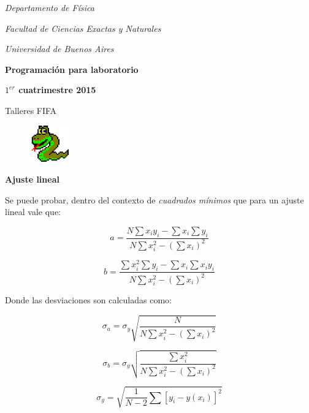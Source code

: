 \documentclass[twoside]{article}
\def\d{\displaystyle}
\begin{document}
\thispagestyle{empty}

\vskip 1cm

\centerline{{\small \textit{Departamento de Física}}}
\centerline{{\small \textit{Facultad de Ciencias Exactas y Naturales }}}
\centerline{{\small \textit{Universidad de Buenos Aires}}}
\vskip 1cm

\centerline{{\bf\large {\sc Programación para laboratorio}}}

\centerline{{\bf\large {\sc $1^{er}$ cuatrimestre 2015}}}

\centerline{{\ttfamily Talleres FIFA}}

\begin{figure}[H]
 \centering
 \includegraphics[width=0.15\textwidth]{fig/Python.png}
 \label{FIFA}
 \end{figure}
 

\bigskip


\centerline{\bf  Ajuste lineal}

\bigskip

Se puede probar, dentro del contexto de \textit{cuadrados mínimos} que para un ajuste lineal vale que:

\begin{equation}
a = \displaystyle\frac{N\sum x_i y_i - \sum x_i \sum y_i}{N \sum x_i^2 - (\sum x_i)^2}
\end{equation}

\begin{equation}
b = \d\frac{\sum x_i^2 \sum y_i - \sum x_i \sum x_i y_i}{N \sum x_i^2 - (\sum x_i)^2}
\end{equation}


Donde las desviaciones son calculadas como:

\begin{equation}
\sigma_a = \sigma_y \sqrt{ \d\frac{N}{N \sum x_i^2 - (\sum x_i)^2}}
\end{equation}

\begin{equation}
\sigma_b = \sigma_y \sqrt{\d\frac{\sum x_i^2}{N \sum x_i^2 - (\sum x_i)^2}}
\end{equation}

\begin{equation}
\sigma_y = \sqrt{\d\frac{1}{N-2}\sum [y_i -y(x_i)]^2}
\end{equation}
\end{document}
